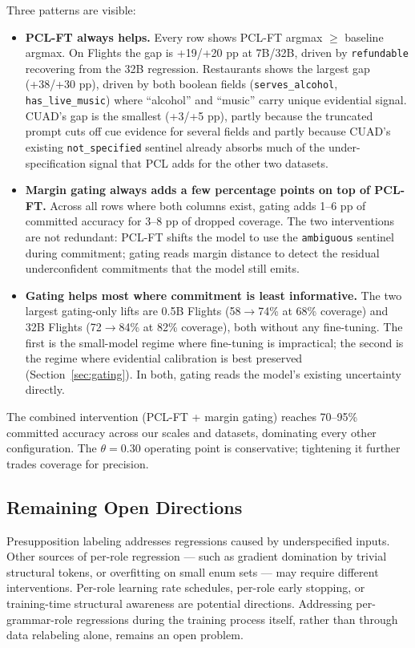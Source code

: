 \documentclass[11pt]{article}
\begin{document}
Three patterns are visible:

\begin{itemize}
\item \textbf{PCL-FT always helps.} Every row shows PCL-FT argmax $\ge$ baseline argmax. On Flights the gap is +19/+20 pp at 7B/32B, driven by \texttt{refundable} recovering from the 32B regression. Restaurants shows the largest gap (+38/+30 pp), driven by both boolean fields (\texttt{serves\_alcohol}, \texttt{has\_live\_music}) where ``alcohol'' and ``music'' carry unique evidential signal. CUAD's gap is the smallest (+3/+5 pp), partly because the truncated prompt cuts off cue evidence for several fields and partly because CUAD's existing \texttt{not\_specified} sentinel already absorbs much of the under-specification signal that PCL adds for the other two datasets.
\item \textbf{Margin gating always adds a few percentage points on top of PCL-FT.} Across all rows where both columns exist, gating adds 1--6 pp of committed accuracy for 3--8 pp of dropped coverage. The two interventions are not redundant: PCL-FT shifts the model to use the \texttt{ambiguous} sentinel during commitment; gating reads margin distance to detect the residual underconfident commitments that the model still emits.
\item \textbf{Gating helps most where commitment is least informative.} The two largest gating-only lifts are 0.5B Flights (58$\rightarrow$74\% at 68\% coverage) and 32B Flights (72$\rightarrow$84\% at 82\% coverage), both without any fine-tuning. The first is the small-model regime where fine-tuning is impractical; the second is the regime where evidential calibration is best preserved (Section~\ref{sec:gating}). In both, gating reads the model's existing uncertainty directly.
\end{itemize}

The combined intervention (PCL-FT + margin gating) reaches 70--95\% committed accuracy across our scales and datasets, dominating every other configuration. The $\theta = 0.30$ operating point is conservative; tightening it further trades coverage for precision.

\subsection{Remaining Open Directions}

Presupposition labeling addresses regressions caused by underspecified inputs. Other sources of per-role regression --- such as gradient domination by trivial structural tokens, or overfitting on small enum sets --- may require different interventions. Per-role learning rate schedules, per-role early stopping, or training-time structural awareness are potential directions. Addressing per-grammar-role regressions during the training process itself, rather than through data relabeling alone, remains an open problem.
\end{document}

